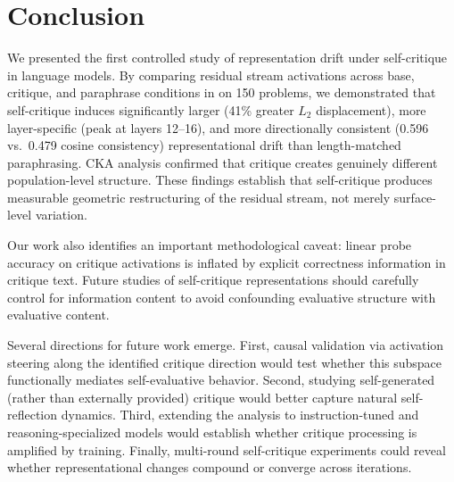 \section{Conclusion}
\label{sec:conclusion}

We presented the first controlled study of representation drift under self-critique in language models. By comparing residual stream activations across base, critique, and paraphrase conditions in \pythia on 150 \gsm problems, we demonstrated that self-critique induces significantly larger (41\% greater $L_2$ displacement), more layer-specific (peak at layers 12--16), and more directionally consistent (0.596 vs.\ 0.479 cosine consistency) representational drift than length-matched paraphrasing. CKA analysis confirmed that critique creates genuinely different population-level structure. These findings establish that self-critique produces measurable geometric restructuring of the residual stream, not merely surface-level variation.

Our work also identifies an important methodological caveat: linear probe accuracy on critique activations is inflated by explicit correctness information in critique text. Future studies of self-critique representations should carefully control for information content to avoid confounding evaluative structure with evaluative content.

Several directions for future work emerge. First, causal validation via activation steering along the identified critique direction would test whether this subspace functionally mediates self-evaluative behavior. Second, studying self-generated (rather than externally provided) critique would better capture natural self-reflection dynamics. Third, extending the analysis to instruction-tuned and reasoning-specialized models would establish whether critique processing is amplified by training. Finally, multi-round self-critique experiments could reveal whether representational changes compound or converge across iterations.
